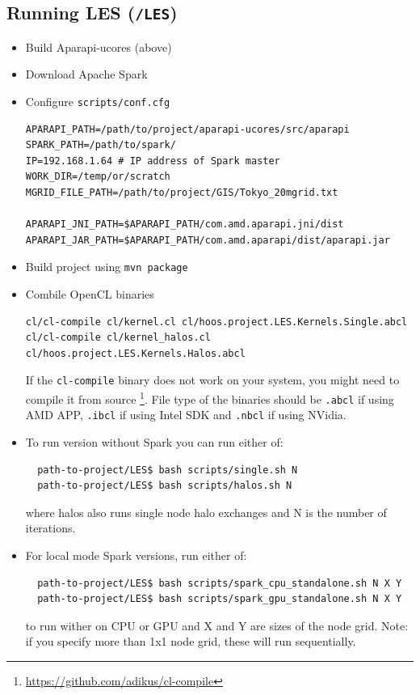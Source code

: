 \documentclass{l4proj}
\begin{document}
\begin{appendices}
\section{Running LES (\texttt{/LES})}

\begin{itemize}
\item Build Aparapi-ucores (above)
\item Download Apache Spark
\item Configure \texttt{scripts/conf.cfg}
\begin{verbatim}
APARAPI_PATH=/path/to/project/aparapi-ucores/src/aparapi
SPARK_PATH=/path/to/spark/
IP=192.168.1.64 # IP address of Spark master
WORK_DIR=/temp/or/scratch
MGRID_FILE_PATH=/path/to/project/GIS/Tokyo_20mgrid.txt

APARAPI_JNI_PATH=$APARAPI_PATH/com.amd.aparapi.jni/dist
APARAPI_JAR_PATH=$APARAPI_PATH/com.amd.aparapi/dist/aparapi.jar
\end{verbatim}

\item Build project using \texttt{mvn package}

\item Combile OpenCL binaries
\begin{verbatim}
cl/cl-compile cl/kernel.cl cl/hoos.project.LES.Kernels.Single.abcl
cl/cl-compile cl/kernel_halos.cl cl/hoos.project.LES.Kernels.Halos.abcl
\end{verbatim}
If the \texttt{cl-compile} binary does not work on your system, you might
need to compile it from source \footnote{\url{https://github.com/adikus/cl-compile}}.
File type of the binaries should be \texttt{.abcl} if using AMD APP, \texttt{.ibcl} if
using Intel SDK and \texttt{.nbcl} if using NVidia.

\item To run version without Spark you can run either of:
\begin{verbatim}
  path-to-project/LES$ bash scripts/single.sh N
  path-to-project/LES$ bash scripts/halos.sh N
\end{verbatim}
where halos also runs single node halo exchanges and N is the number of iterations.

\item For local mode Spark versions, run either of:
\begin{verbatim}
  path-to-project/LES$ bash scripts/spark_cpu_standalone.sh N X Y
  path-to-project/LES$ bash scripts/spark_gpu_standalone.sh N X Y
\end{verbatim}
to run wither on CPU or GPU and X and Y are sizes of the node grid. 
Note: if you specify more than 1x1 node grid, these will run sequentially.


\end{itemize}
\end{appendices}
\end{document}
